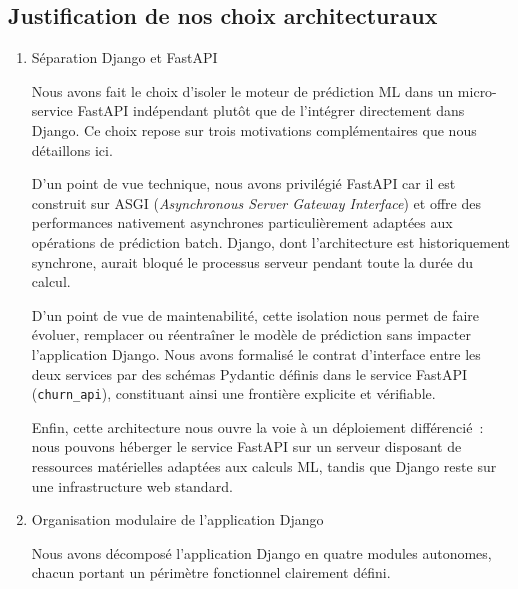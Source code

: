 \subsection{Justification de nos choix architecturaux}
\begin{enumerate}
\item Séparation Django et FastAPI

Nous avons fait le choix d'isoler le moteur de prédiction ML dans un micro-service FastAPI
indépendant plutôt que de l'intégrer directement dans Django. Ce choix
repose sur trois motivations complémentaires que nous détaillons ici.

D'un point de vue technique, nous avons privilégié FastAPI car il est construit sur ASGI
(\textit{Asynchronous Server Gateway Interface}) et offre des
performances nativement asynchrones particulièrement adaptées aux
opérations de prédiction batch. Django, dont l'architecture est
historiquement synchrone, aurait bloqué le processus serveur pendant
toute la durée du calcul.

D'un point de vue de maintenabilité, cette isolation nous permet
de faire évoluer, remplacer ou réentraîner le modèle de prédiction
sans impacter l'application Django. Nous avons formalisé le contrat d'interface entre les
deux services par des schémas Pydantic définis dans le
service FastAPI (\texttt{churn\_api}), constituant ainsi une frontière
explicite et vérifiable.

Enfin, cette architecture nous ouvre la voie à un déploiement
différencié~: nous pouvons héberger le service FastAPI sur un serveur
disposant de ressources matérielles adaptées aux calculs ML, tandis
que Django reste sur une infrastructure web standard.

\item Organisation modulaire de l'application Django

Nous avons décomposé l'application Django en quatre modules autonomes,
chacun portant un périmètre fonctionnel clairement défini.


\end{enumerate}

